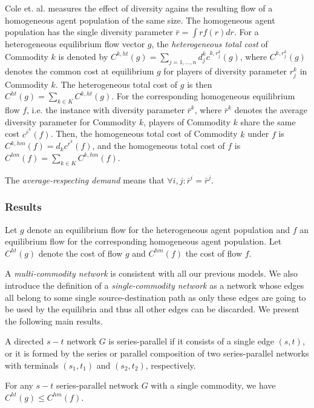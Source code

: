 Cole et. al. measures the effect of diversity agains the resulting flow of a homogeneous agent population of the same size. The homogeneous agent population has the single diversity parameter $\bar{r}=\int rf(r)d r$. For a heterogeneous equilibrium flow vector $g$, the {\it heterogeneous total cost} of Commodity $k$ is denoted by $C^{k,ht}(g)=\sum_{j=1,\dots, n} d_j^k c^{k, r_j^k}(g)$, where $C^{k, r_j^k}(g)$ denotes the common cost at equilibrium $g$ for players of diversity parameter $r_j^k$ in Commodity $k$. The heterogeneous total cost of $g$ is then $C^{ht}(g)=\sum_{k\in K} C^{k,ht}(g)$. For the corresponding homogeneous equilibrium flow $f$, i.e. the instance with diversity parameter $\bar{r}^k$, where $\bar{r}^k$ denotes the average diversity parameter for Commodity $k$, players of Commodity $k$ share the same cost $c^{\bar{r}^k}(f)$. Then, the homogeneous total cost of Commodity $k$ under $f$ is $C^{k,hm}(f)=d_kc^{\bar{r}^k}(f)$, and the homogeneous total cost of $f$ is $C^{hm}(f)=\sum_{k\in K} C^{k,hm}(f)$. 

The {\it average-respecting demand} means that $\forall i,j: \bar{r}^i=\bar{r}^j$. 


\subsubsection{Results}
Let $g$ denote an equilibrium flow for the heterogeneous agent population and $f$ an equilibrium flow for the corresponding homogeneous agent population. Let $C^{ht}(g)$ denote the cost of flow $g$ and $C^{hm}(f)$ the cost of flow $f$. 

A {\it multi-commodity network} is consistent with all our previous models. We also introduce the definition of a {\it single-commodity network} as a network whose edges all belong to some single source-destination path as only these edges are going to be used by the equilibria and thus all other edges can be discarded. We present the following main results.

\begin{definition}A directed $s-t$ network $G$ is series-parallel if it consists of a single edge $(s, t)$, or it is formed by the series or parallel composition of two series-parallel networks with terminals $(s_1, t_1)$ and $(s_2, t_2)$, respectively.
\end{definition}

\begin{theorem}
For any $s-t$ series-parallel network $G$ with a single commodity, we have $C^{ht}(g)\le C^{hm}(f)$.
\label{diverse1}
\end{theorem}

